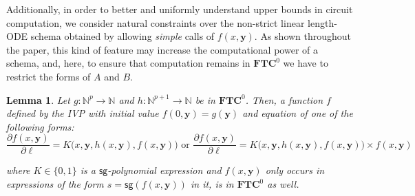 \documentclass[11pt, oneside]{article}
\newcommand{\fun}[1]{\mathsf{#1}}
\newcommand{\Nat}{\mathbb{N}}
\newcommand{\TC}{\mathbf{FTC}}
\newcommand{\tu}[1]{\mathbf{#1}}
\newtheorem{lemma}{Lemma}
\theoremstyle{definition}
\begin{document}
Additionally, in order to better and uniformly understand upper bounds in circuit computation, we consider natural constraints over the non-strict linear length-ODE schema obtained by allowing \emph{simple} calls of $f(x, \tu y)$.
%
As shown throughout the paper, this kind of feature may increase the computational power of a schema, and, here, to ensure that computation remains in $\TC^0$ we have to restrict the forms of $A$ and $B$. 

\begin{lemma}\label{lemma:TCODE}
    Let $g:\Nat^{p}\to\Nat$ and $h:\Nat^{p+1}\to \Nat$ be in $\TC^0$. 
    Then, a function $f$ defined by the IVP with initial value $f(0, \tu y) = g(\tu y)$ and equation of one of the following forms: 
$$
        \frac{\partial f(x, \tu y)}{\partial \ell} = K\big(x, \tu y, h(x, \tu y), f(x, \tu y)\big) \mbox{ or }  \frac{\partial f(x, \tu y)}{\partial \ell} = K\big(x, \tu y, h(x, \tu y), f(x, \tu y)\big)\times f(x,\tu y)
$$
     
       
    
    \noindent where $K\in \{0,1\}$ is a $\fun{sg}$-polynomial expression and $f(x, \tu y)$ only occurs in expressions of the form $s=\fun{sg}(f(x, \tu y))$ in it, is in $\TC^0$ as well.
\end{lemma}
\end{document}
